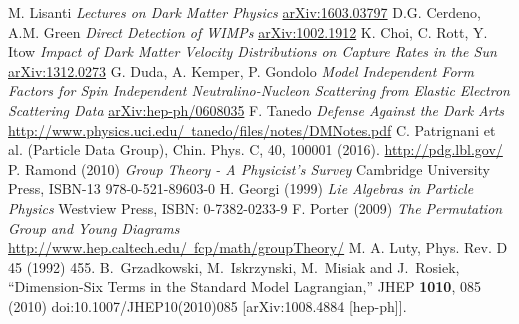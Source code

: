 \begin{thebibliography}{xxx}
 M. Lisanti \textit{Lectures on Dark Matter Physics} \href{https://arxiv.org/abs/1603.03797}{arXiv:1603.03797}
 D.G. Cerdeno, A.M. Green \textit{Direct Detection of WIMPs} \href{https://arxiv.org/abs/1002.1912}{arXiv:1002.1912}
 K. Choi, C. Rott, Y. Itow \textit{Impact of Dark Matter Velocity Distributions on Capture Rates in the Sun} \href{https://arxiv.org/abs/1312.0273}{arXiv:1312.0273}
 G. Duda, A. Kemper, P. Gondolo \textit{Model Independent Form Factors for Spin Independent Neutralino-Nucleon Scattering from Elastic Electron Scattering Data} \href{https://arxiv.org/abs/hep-ph/0608035v2}{arXiv:hep-ph/0608035}
 F. Tanedo \textit{Defense Against the Dark Arts}\\ \href{http://www.physics.uci.edu/~tanedo/files/notes/DMNotes.pdf}{http://www.physics.uci.edu/~tanedo/files/notes/DMNotes.pdf}
 C. Patrignani et al. (Particle Data Group), Chin. Phys. C, 40, 100001 (2016). \href{http://pdg.lbl.gov/}{http://pdg.lbl.gov/}
 P. Ramond (2010) \textit{Group Theory - A Physicist's Survey} Cambridge University Press, ISBN-13 978-0-521-89603-0 
 H. Georgi (1999) \textit{Lie Algebras in Particle Physics} Westview Press, ISBN: 0-7382-0233-9
 F. Porter (2009) \textit{The Permutation Group and Young Diagrams} \href{http://www.hep.caltech.edu/~fcp/math/groupTheory/}{http://www.hep.caltech.edu/~fcp/math/groupTheory/}
 M. A. Luty, Phys. Rev. D 45 (1992) 455.
  B.~Grzadkowski, M.~Iskrzynski, M.~Misiak and J.~Rosiek,
  ``Dimension-Six Terms in the Standard Model Lagrangian,''
  JHEP {\bf 1010}, 085 (2010)
  doi:10.1007/JHEP10(2010)085
  [arXiv:1008.4884 [hep-ph]].
\end{thebibliography}